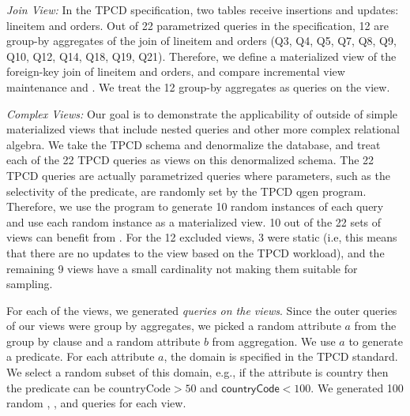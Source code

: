 \emph{Join View:} In the TPCD specification, two tables receive insertions and updates: \textsf{lineitem} and \textsf{orders}.
Out of 22 parametrized queries in the specification, 12 are group-by aggregates of the join of \textsf{lineitem} and \textsf{orders} (Q3, Q4, Q5, Q7, Q8, Q9, Q10, Q12, Q14, Q18, Q19, Q21).
Therefore, we define a materialized view of the foreign-key join of \textsf{lineitem} and \textsf{orders}, and compare incremental view maintenance and \svc.
We treat the 12 group-by aggregates as queries on the view.


\emph{Complex Views:} Our goal is to demonstrate the applicability of \svc outside of simple materialized views that include nested queries and other more complex relational algebra.
We take the TPCD schema and denormalize the database, and treat each of the 22 
TPCD queries as views on this denormalized schema. 
The 22 TPCD queries are actually parametrized queries where parameters, such as the selectivity of the predicate, are randomly set by the TPCD \textsf{qgen} program.
Therefore, we use the program to generate 10 random instances of each query and use each random instance as a materialized view.
10 out of the 22 sets of views can benefit from \svc.
For the 12 excluded views, 3 were static (i.e, this means that there are no updates to the view based on the TPCD workload), and the remaining 9 views have a small cardinality not making them suitable for sampling.

For each of the views, we generated \emph{queries on the views}.
Since the outer queries of our views were group by aggregates, we picked a random attribute $a$ from the group by clause and a random attribute $b$ from aggregation.
We use $a$ to generate a predicate.
For each attribute $a$, the domain is specified in the TPCD standard.
We select a random subset of this domain, e.g., if the attribute is country then the predicate can be $\text{countryCode} > 50$ and $\textsf{countryCode} < 100$.
We generated 100 random \sumfunc, \avgfunc, and \countfunc queries for each view.

